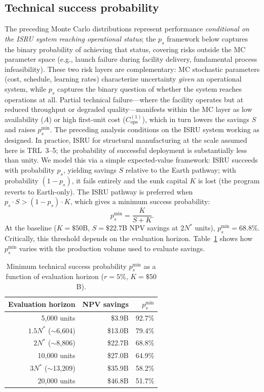 \documentclass[preprint,12pt]{elsarticle}
\begin{document}
\subsection{Technical success probability}
\label{sec:success_probability}

The preceding Monte Carlo distributions represent performance \emph{conditional on the ISRU system reaching operational status}; the $p_s$ framework below captures the binary probability of achieving that status, covering risks outside the MC parameter space (e.g., launch failure during facility delivery, fundamental process infeasibility). These two risk layers are complementary: MC stochastic parameters (cost, schedule, learning rates) characterize uncertainty \emph{given} an operational system, while $p_s$ captures the binary question of whether the system reaches operations at all. Partial technical failure---where the facility operates but at reduced throughput or degraded quality---manifests within the MC layer as low availability ($A$) or high first-unit cost ($C_{\mathrm{ops}}^{(1)}$), which in turn lowers the savings $S$ and raises $p_s^{\min}$. The preceding analysis conditions on the ISRU system working as designed. In practice, ISRU for structural manufacturing at the scale assumed here is TRL~3--5; the probability of successful deployment is substantially less than unity. We model this via a simple expected-value framework: ISRU succeeds with probability $p_s$, yielding savings $S$ relative to the Earth pathway; with probability $(1 - p_s)$, it fails entirely and the sunk capital $K$ is lost (the program reverts to Earth-only). The ISRU pathway is preferred when $p_s \cdot S > (1 - p_s) \cdot K$, which gives a minimum success probability:
\begin{equation}
  p_s^{\min} = \frac{K}{S + K}.
  \label{eq:p_success}
\end{equation}
At the baseline ($K = \$50$B, $S = \$22.7$B NPV savings at $2N^*$ units), $p_s^{\min} = 68.8\%$. Critically, this threshold depends on the evaluation horizon. Table~\ref{tab:ps_horizon} shows how $p_s^{\min}$ varies with the production volume used to evaluate savings.

\begin{table}[htbp]
\centering
\caption{Minimum technical success probability $p_s^{\min}$ as a function of evaluation horizon ($r = 5\%$, $K = \$50$B).}
\label{tab:ps_horizon}
\small
\begin{tabular}{@{}rrr@{}}
\toprule
Evaluation horizon & NPV savings & $p_s^{\min}$ \\
\midrule
5{,}000 units            & \$3.9B   & 92.7\% \\
$1.5 N^*$ ($\sim$6{,}604) & \$13.0B  & 79.4\% \\
$2 N^*$ ($\sim$8{,}806)   & \$22.7B  & 68.8\% \\
10{,}000 units           & \$27.0B  & 64.9\% \\
$3 N^*$ ($\sim$13{,}209)  & \$35.9B  & 58.2\% \\
20{,}000 units           & \$46.8B  & 51.7\% \\
\bottomrule
\end{tabular}
\end{table}
\end{document}
